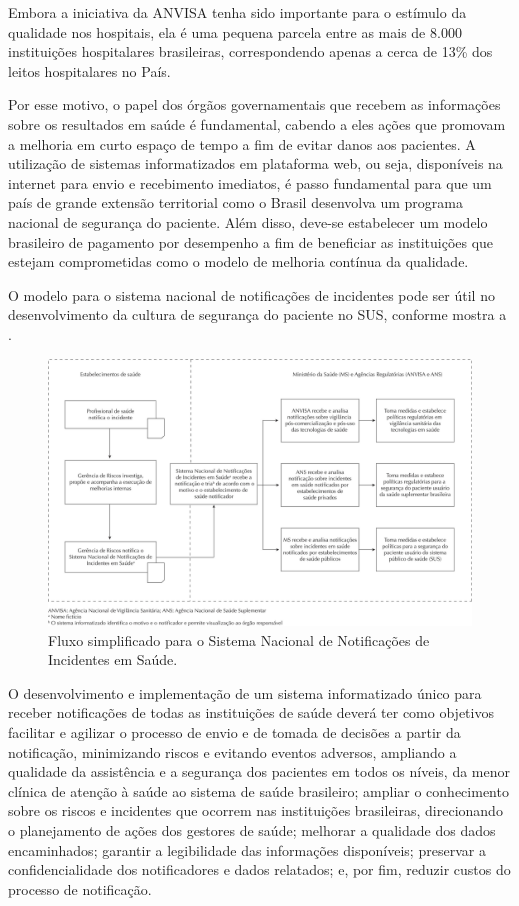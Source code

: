\documentclass{article}
\begin{document}
Embora a iniciativa da ANVISA tenha sido importante para o estímulo da qualidade
nos
hospitais, ela é uma pequena parcela entre as mais de 8.000 instituições
hospitalares
brasileiras, correspondendo apenas a cerca de 13\% dos leitos hospitalares no
País.

Por esse motivo, o papel dos órgãos governamentais que recebem as informações
sobre os
resultados em saúde é fundamental, cabendo a eles ações que promovam a melhoria
em curto
espaço de tempo a fim de evitar danos aos pacientes. A utilização de sistemas
informatizados
em plataforma web, ou seja, disponíveis na internet para envio e recebimento
imediatos, é
passo fundamental para que um país de grande extensão territorial como o Brasil
desenvolva
um programa nacional de segurança do paciente. Além disso, deve-se estabelecer
um modelo
brasileiro de pagamento por desempenho a fim de beneficiar as instituições que
estejam
comprometidas como o modelo de melhoria contínua da qualidade.

O modelo para o sistema nacional de notificações de incidentes pode ser útil no
desenvolvimento da cultura de segurança do paciente no SUS, conforme mostra a
.

\begin{figure}
\includegraphics[width=\textwidth]{0034-8910-rsp-47-04-0791-gf01}
\caption{Fluxo simplificado para o Sistema Nacional de Notificações de
Incidentes em
Saúde.}
\end{figure}

O desenvolvimento e implementação de um sistema informatizado único para receber
notificações de todas as instituições de saúde deverá ter como objetivos
facilitar e
agilizar o processo de envio e de tomada de decisões a partir da notificação,
minimizando
riscos e evitando eventos adversos, ampliando a qualidade da assistência e a
segurança dos
pacientes em todos os níveis, da menor clínica de atenção à saúde ao sistema de
saúde
brasileiro; ampliar o conhecimento sobre os riscos e incidentes que ocorrem nas
instituições
brasileiras, direcionando o planejamento de ações dos gestores de saúde;
melhorar a
qualidade dos dados encaminhados; garantir a legibilidade das informações
disponíveis;
preservar a confidencialidade dos notificadores e dados relatados; e, por fim,
reduzir
custos do processo de notificação.
\end{document}
